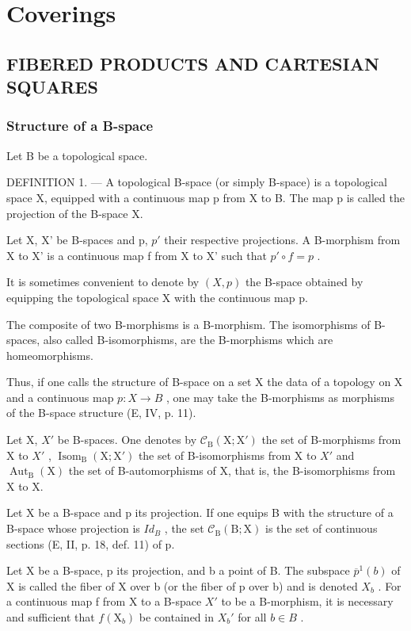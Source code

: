 
\chapter{Coverings}

\section{FIBERED PRODUCTS AND CARTESIAN SQUARES}

\subsection{Structure of a B-space}

Let B be a topological space.

DEFINITION 1. --- A topological B-space (or simply B-space) is a topological space X, equipped with a continuous map p from X to B. The map p is called the projection of the B-space X.

Let X, X' be B-spaces and p, \(p'\) their respective projections. A B-morphism from X to X' is a continuous map f from X to X' such that \(p' \circ f = p\) .

It is sometimes convenient to denote by \((X,p)\) the B-space obtained by equipping the topological space X with the continuous map p.

The composite of two B-morphisms is a B-morphism. The isomorphisms of B-spaces, also called B-isomorphisms, are the B-morphisms which are homeomorphisms.

Thus, if one calls the structure of B-space on a set X the data of a topology on X and a continuous map \(p: X \rightarrow B\) , one may take the B-morphisms as morphisms of the B-space structure (E, IV, p. 11).

Let X, \(X'\) be B-spaces. One denotes by \(\mathcal{C}_{\mathrm{B}}(\mathrm{X};\mathrm{X}')\) the set of B-morphisms from X to \(X'\) , \(\operatorname{Isom}_{\mathrm{B}}(\mathrm{X};\mathrm{X}')\) the set of B-isomorphisms from X to \(X'\) and \(\operatorname{Aut}_{\mathrm{B}}(\mathrm{X})\) the set of B-automorphisms of X, that is, the B-isomorphisms from X to X.

Let X be a B-space and p its projection. If one equips B with the structure of a B-space whose projection is \(Id_{B}\) , the set \(\mathcal{C}_{\mathrm{B}}(\mathrm{B};\mathrm{X})\) is the set of continuous sections (E, II, p. 18, def. 11) of p.

Let X be a B-space, p its projection, and b a point of B. The subspace \(\overline{p}^{1}(b)\) of X is called the fiber of X over b (or the fiber of p over b) and is denoted \(X_{b}\) . For a continuous map f from X to a B-space \(X'\) to be a B-morphism, it is necessary and sufficient that \(f(\mathrm{X}_{b})\) be contained in \(X_{b}'\) for all \(b \in B\) .

